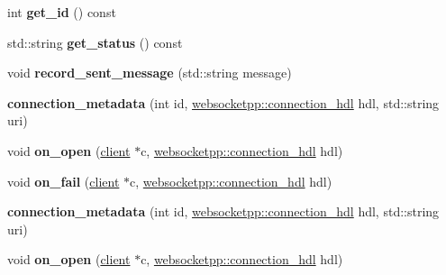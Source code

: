 \begin{DoxyCompactItemize}
\item 
int {\bfseries get\+\_\+id} () const\hypertarget{classconnection__metadata_a3f71fbb092ec54e496464e42d960a22d}{}\label{classconnection__metadata_a3f71fbb092ec54e496464e42d960a22d}

\item 
std\+::string {\bfseries get\+\_\+status} () const\hypertarget{classconnection__metadata_aefe28a6b0b27076c685d66727e0f0a9d}{}\label{classconnection__metadata_aefe28a6b0b27076c685d66727e0f0a9d}

\item 
void {\bfseries record\+\_\+sent\+\_\+message} (std\+::string message)\hypertarget{classconnection__metadata_aa6940efad5f50a3e4f9789d51ebbea75}{}\label{classconnection__metadata_aa6940efad5f50a3e4f9789d51ebbea75}

\item 
{\bfseries connection\+\_\+metadata} (int id, \hyperlink{namespacewebsocketpp_a6b3d26a10ee7229b84b776786332631d}{websocketpp\+::connection\+\_\+hdl} hdl, std\+::string uri)\hypertarget{classconnection__metadata_ab73db2e336676ec4efa4d4dc5051958f}{}\label{classconnection__metadata_ab73db2e336676ec4efa4d4dc5051958f}

\item 
void {\bfseries on\+\_\+open} (\hyperlink{classwebsocketpp_1_1client}{client} $\ast$c, \hyperlink{namespacewebsocketpp_a6b3d26a10ee7229b84b776786332631d}{websocketpp\+::connection\+\_\+hdl} hdl)\hypertarget{classconnection__metadata_ab10d997bd75d9e98b235b7e97b84b85a}{}\label{classconnection__metadata_ab10d997bd75d9e98b235b7e97b84b85a}

\item 
void {\bfseries on\+\_\+fail} (\hyperlink{classwebsocketpp_1_1client}{client} $\ast$c, \hyperlink{namespacewebsocketpp_a6b3d26a10ee7229b84b776786332631d}{websocketpp\+::connection\+\_\+hdl} hdl)\hypertarget{classconnection__metadata_a1c2e652001b8306207beafe17b1a52ed}{}\label{classconnection__metadata_a1c2e652001b8306207beafe17b1a52ed}

\item 
{\bfseries connection\+\_\+metadata} (int id, \hyperlink{namespacewebsocketpp_a6b3d26a10ee7229b84b776786332631d}{websocketpp\+::connection\+\_\+hdl} hdl, std\+::string uri)\hypertarget{classconnection__metadata_ab73db2e336676ec4efa4d4dc5051958f}{}\label{classconnection__metadata_ab73db2e336676ec4efa4d4dc5051958f}

\item 
void {\bfseries on\+\_\+open} (\hyperlink{classwebsocketpp_1_1client}{client} $\ast$c, \hyperlink{namespacewebsocketpp_a6b3d26a10ee7229b84b776786332631d}{websocketpp\+::connection\+\_\+hdl} hdl)\hypertarget{classconnection__metadata_ab10d997bd75d9e98b235b7e97b84b85a}{}\label{classconnection__metadata_ab10d997bd75d9e98b235b7e97b84b85a}


\end{DoxyCompactItemize}
